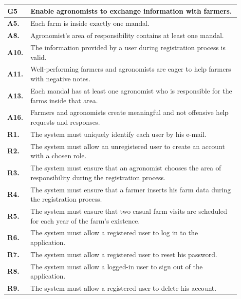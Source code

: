 \begin{longtable}{p{0.07\linewidth} p{0.88\linewidth}} 
    \toprule
    \textbf{G5} & Enable agronomists to exchange information with farmers. \\ 
    \midrule
    \textbf{A5.} & Each farm is inside exactly one mandal.\\ 
    \textbf{A8.} & Agronomist's area of responsibility contains at least one mandal.\\ 
    \textbf{A10.} & The information provided by a user during registration process is valid.\\ 
    \textbf{A11.} & Well-performing farmers and agronomists are eager to help farmers with negative notes.\\ 
    \textbf{A13.} & Each mandal has at least one agronomist who is responsible for the farms inside that area.\\ 
    \textbf{A16.} & Farmers and agronomists create meaningful and not offensive help requests and responses. \\
    \midrule
    
	\textbf{R1.} & The system must uniquely identify each user by his e-mail. \\
	\textbf{R2.} & The system must allow an unregistered user to create an account with a chosen role. \\
	\textbf{R3.} & The system must ensure that an agronomist chooses the area of responsibility during the registration process. \\
	\textbf{R4.} & The system must ensure that a farmer inserts his farm data during the registration process.\\
	\textbf{R5.} & The system must ensure that two casual farm visits are scheduled for each year of the farm's existence.\\
	\textbf{R6.} & The system must allow a registered user to log in to the application. \\
	\textbf{R7.} & The system must allow a registered user to reset his password. \\
	\textbf{R8.} & The system must allow a logged-in user to sign out of the application. \\
	\textbf{R9.} & The system must allow a registered user to delete his account. \\
	

\end{longtable}

